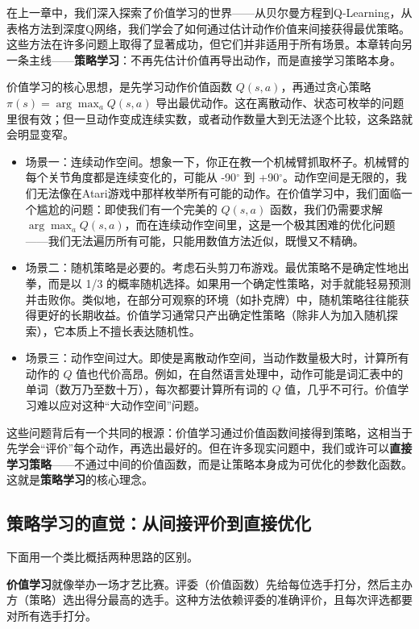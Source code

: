 \documentclass[lang=cn,zihao=-4,a4paper,fontset=windows]{beautybook}
\begin{document}
在上一章中，我们深入探索了价值学习的世界——从贝尔曼方程到Q-Learning，从表格方法到深度Q网络，我们学会了如何通过估计动作价值来间接获得最优策略。这些方法在许多问题上取得了显著成功，但它们并非适用于所有场景。本章转向另一条主线——\textbf{策略学习}：不再先估计价值再导出动作，而是直接学习策略本身。

价值学习的核心思想，是先学习动作价值函数 \(Q(s,a)\)，再通过贪心策略 \(\pi(s) = \arg\max_a Q(s,a)\) 导出最优动作。这在离散动作、状态可枚举的问题里很有效；但一旦动作变成连续实数，或者动作数量大到无法逐个比较，这条路就会明显变窄。

\begin{itemize}
\item 场景一：连续动作空间。想象一下，你正在教一个机械臂抓取杯子。机械臂的每个关节角度都是连续变化的，可能从 -90$^\circ$ 到 +90$^\circ$。动作空间是无限的，我们无法像在Atari游戏中那样枚举所有可能的动作。在价值学习中，我们面临一个尴尬的问题：即使我们有一个完美的 \(Q(s,a)\) 函数，我们仍需要求解 \(\arg\max_a Q(s,a)\)，而在连续动作空间里，这是一个极其困难的优化问题——我们无法遍历所有可能，只能用数值方法近似，既慢又不精确。
\item 场景二：随机策略是必要的。考虑石头剪刀布游戏。最优策略不是确定性地出拳，而是以 1/3 的概率随机选择。如果用一个确定性策略，对手就能轻易预测并击败你。类似地，在部分可观察的环境（如扑克牌）中，随机策略往往能获得更好的长期收益。价值学习通常只产出确定性策略（除非人为加入随机探索），它本质上不擅长表达随机性。
\item 场景三：动作空间过大。即使是离散动作空间，当动作数量极大时，计算所有动作的 \(Q\) 值也代价高昂。例如，在自然语言处理中，动作可能是词汇表中的单词（数万乃至数十万），每次都要计算所有词的 \(Q\) 值，几乎不可行。价值学习难以应对这种“大动作空间”问题。
\end{itemize}
这些问题背后有一个共同的根源：价值学习通过价值函数间接得到策略，这相当于先学会“评价”每个动作，再选出最好的。但在许多现实问题中，我们或许可以\textbf{直接学习策略}——不通过中间的价值函数，而是让策略本身成为可优化的参数化函数。这就是\textbf{策略学习}的核心理念。

\subsection{策略学习的直觉：从间接评价到直接优化}

下面用一个类比概括两种思路的区别。

\textbf{价值学习}就像举办一场才艺比赛。评委（价值函数）先给每位选手打分，然后主办方（策略）选出得分最高的选手。这种方法依赖评委的准确评价，且每次评选都要对所有选手打分。
\end{document}
